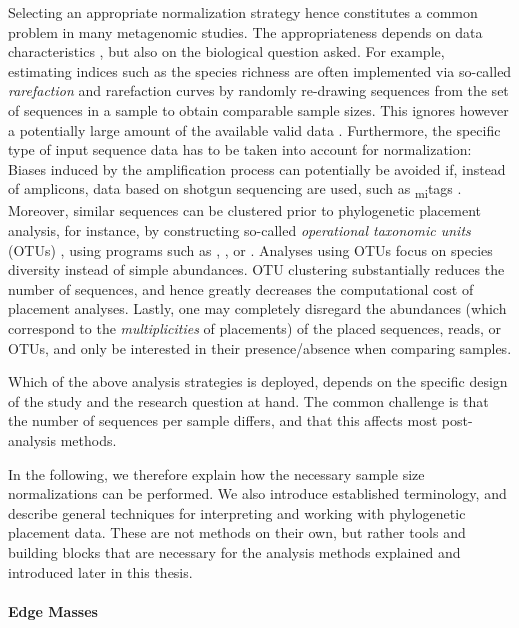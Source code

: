 Selecting an appropriate normalization strategy hence constitutes a common problem in many metagenomic studies.
The appropriateness depends on data characteristics \cite{Weiss2017}, but also on the biological question asked.
For example, estimating indices such as the species richness are often implemented
via so-called \emph{rarefaction} and rarefaction curves \cite{Gotelli2001}
by randomly re-drawing sequences from the set of sequences in a sample to obtain comparable sample sizes.
This ignores however a potentially large amount of the available valid data \cite{McMurdie2014}.
Furthermore, the specific type of input sequence data has to be taken into account for normalization:
Biases induced by the amplification process can potentially be avoided if, instead of amplicons,
data based on shotgun sequencing are used, such as \textsubscript{mi}tags \cite{Logares2014}.
Moreover, similar sequences can be clustered prior to phylogenetic placement analysis, for instance,
by constructing so-called \emph{operational taxonomic units} (OTUs) \cite{Sokal1963,Blaxter2005},
using programs such as  \cite{Edgar2010},
 \cite{Rognes2016}, or  \cite{Mahe2014,Mahe2015}.
Analyses using OTUs focus on species diversity instead of simple abundances.
OTU clustering substantially reduces the number of sequences,
and hence greatly decreases the computational cost of placement analyses.
Lastly, one may completely disregard the abundances (which correspond to the \emph{multiplicities} of placements)
of the placed sequences, reads, or OTUs, and only be interested in their presence/absence when comparing samples.

Which of the above analysis strategies is deployed,
depends on the specific design of the study and the research question at hand.
The common challenge is that the number of sequences per sample differs,
and that this affects most post-analysis methods.

In the following, we therefore explain how the necessary sample size normalizations can be performed.
We also introduce established terminology,
and describe general techniques for interpreting and working with phylogenetic placement data.
These are not methods on their own, but rather tools and building blocks
that are necessary for the analysis methods explained and introduced later in this thesis.

\paragraph{Edge Masses}
\label{ch:Foundations:sec:PhylogeneticPlacement:sub:PlacementProcessing:par:EdgeMasses}

